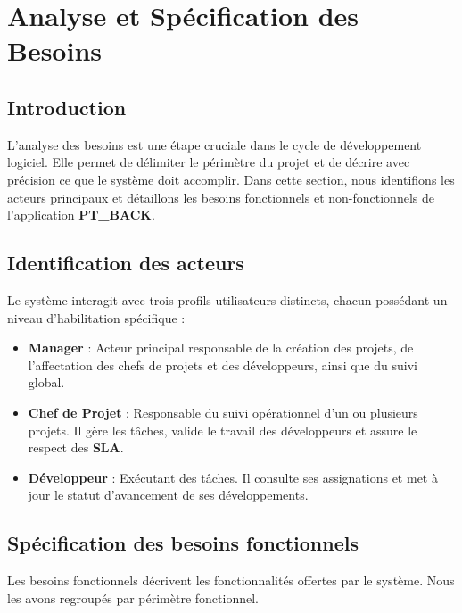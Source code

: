 \chapter{Analyse et Sp\'{e}cification des Besoins}

\section{Introduction}
L'analyse des besoins est une \'{e}tape cruciale dans le cycle de d\'{e}veloppement logiciel.
Elle permet de d\'{e}limiter le p\'{e}rim\`{e}tre du projet et de d\'{e}crire avec pr\'{e}cision ce que
le syst\`{e}me doit accomplir. Dans cette section, nous identifions les acteurs
principaux et d\'{e}taillons les besoins fonctionnels et non-fonctionnels de l'application \textbf{PT\_BACK}.

\section{Identification des acteurs}
Le syst\`{e}me interagit avec trois profils utilisateurs distincts, chacun poss\'{e}dant un
niveau d'habilitation sp\'{e}cifique :

\begin{itemize}[leftmargin=*, label=\textcolor{emsiRed}{}]
  \item \textbf{Manager} : Acteur principal responsable de la cr\'{e}ation des projets,
  de l'affectation des chefs de projets et des d\'{e}veloppeurs, ainsi que du suivi global.
  \item \textbf{Chef de Projet} : Responsable du suivi op\'{e}rationnel d'un ou plusieurs projets.
  Il g\`{e}re les t\^{a}ches, valide le travail des d\'{e}veloppeurs et assure le respect des \textbf{SLA}.
  \item \textbf{D\'{e}veloppeur} : Ex\'{e}cutant des t\^{a}ches. Il consulte ses assignations et met \`{a}
  jour le statut d'avancement de ses d\'{e}veloppements.
\end{itemize}

\section{Sp\'{e}cification des besoins fonctionnels}

Les besoins fonctionnels d\'{e}crivent les fonctionnalit\'{e}s offertes par le syst\`{e}me.
Nous les avons regroup\'{e}s par p\'{e}rim\`{e}tre fonctionnel.

